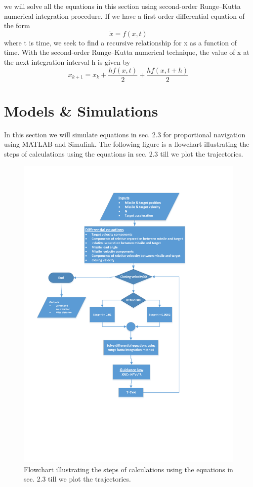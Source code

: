 we will solve all the equations in this section using second-order Runge–Kutta numerical integration procedure. If we have a first order differential equation of the form 
\begin{equation*}
	\dot{x} = f(x,t) 
\end{equation*} 
 where t is time, we seek to find a recursive relationship for x as a function of time.
 With the second-order Runge–Kutta numerical technique, the value of x at the
 next integration interval h is given by
 \begin{equation*}
 	x_{k+1} = x_k + \dfrac{hf(x,t)}{2} + \dfrac{h f(x, t+h)}{2}
 \end{equation*}
\section{Models \& Simulations}

In this section we will simulate equations in sec. 2.3 for proportional navigation using MATLAB and Simulink.
The following figure is a flowchart illustrating the steps of calculations using the equations in sec. 2.3  till we plot the trajectories.

\begin{figure}[htb]
	\centering
	\includegraphics[scale = 0.85]{fig/FlowchartPN.pdf}
	\caption{Flowchart illustrating the steps of calculations using the equations in sec. 2.3  till we plot the trajectories.}
	\label{flowchart PN}
\end{figure}


